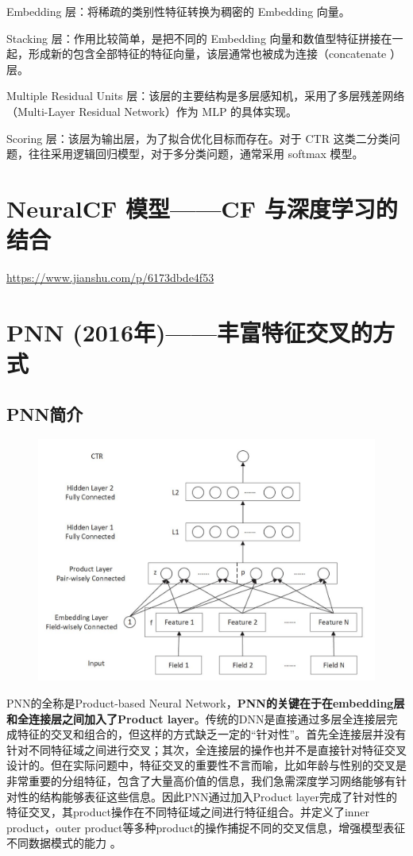 \documentclass[12pt]{article}
\begin{document}
Embedding 层：将稀疏的类别性特征转换为稠密的 Embedding 向量。

Stacking 层：作用比较简单，是把不同的 Embedding 向量和数值型特征拼接在一起，形成新的包含全部特征的特征向量，该层通常也被成为连接（concatenate ）层。

Multiple Residual Units 层：该层的主要结构是多层感知机，采用了多层残差网络（Multi-Layer Residual Network）作为 MLP 的具体实现。

Scoring 层：该层为输出层，为了拟合优化目标而存在。对于 CTR 这类二分类问题，往往采用逻辑回归模型，对于多分类问题，通常采用 softmax 模型。

\section{NeuralCF 模型——CF 与深度学习的结合}
\url{https://www.jianshu.com/p/6173dbde4f53}


\section{PNN (2016年)——丰富特征交叉的方式}
\subsection{PNN简介}
\begin{figure}[H]
    \centering
    \includegraphics[width=.6\textwidth]{fig/PNN_Structure.jpg}
\end{figure}

PNN的全称是Product-based Neural Network，\textbf{PNN的关键在于在embedding层和全连接层之间加入了Product layer}。传统的DNN是直接通过多层全连接层完成特征的交叉和组合的，但这样的方式缺乏一定的“针对性”。首先全连接层并没有针对不同特征域之间进行交叉；其次，全连接层的操作也并不是直接针对特征交叉设计的。但在实际问题中，特征交叉的重要性不言而喻，比如年龄与性别的交叉是非常重要的分组特征，包含了大量高价值的信息，我们急需深度学习网络能够有针对性的结构能够表征这些信息。因此PNN通过加入Product layer完成了针对性的特征交叉，其product操作在不同特征域之间进行特征组合。并定义了inner product，outer product等多种product的操作捕捉不同的交叉信息，增强模型表征不同数据模式的能力 。
\end{document}
